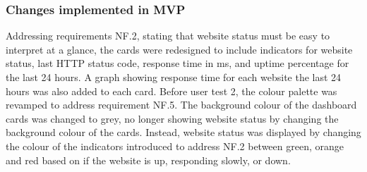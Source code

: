 \subsubsection{Changes implemented in MVP}  
Addressing requirements NF.2, stating that website status must be easy to interpret at a glance, the cards were redesigned to include indicators for website status, last HTTP status code, response time in ms, and uptime percentage for the last 24 hours. A graph showing response time for each website the last 24 hours was also added to each card. Before user test 2, the colour palette was revamped to address requirement NF.5. The background colour of the dashboard cards was changed to grey, no longer showing website status by changing the background colour of the cards. Instead, website status was displayed by changing the colour of the indicators introduced to address NF.2 between green, orange and red based on if the website is up, responding slowly, or down.


